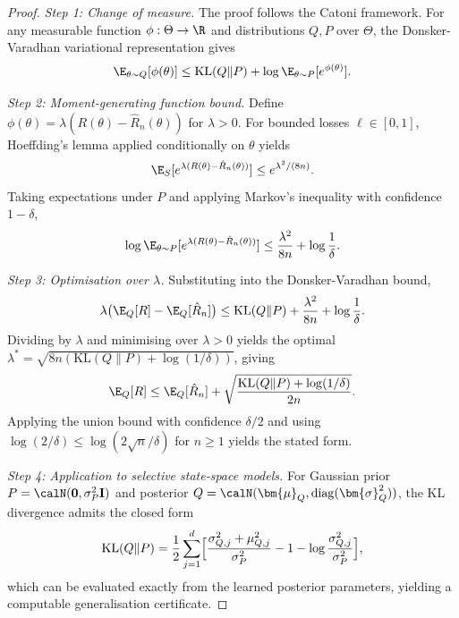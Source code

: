 \begin{proof}
\textit{Step 1: Change of measure.} The proof follows the Catoni framework. For any measurable function $\phi:\Theta\to\R$ and distributions $Q,P$ over $\Theta$, the Donsker-Varadhan variational representation gives
\begin{equation}
\E_{\theta\sim Q}[\phi(\theta)] \le \mathrm{KL}(Q\|P) + \log\E_{\theta\sim P}[e^{\phi(\theta)}].
\end{equation}

\textit{Step 2: Moment-generating function bound.} Define $\phi(\theta) = \lambda(R(\theta)-\hat{R}_n(\theta))$ for $\lambda>0$. For bounded losses $\ell\in[0,1]$, Hoeffding's lemma applied conditionally on $\theta$ yields
\begin{equation}
\E_S[e^{\lambda(R(\theta)-\hat{R}_n(\theta))}] \le e^{\lambda^2/(8n)}.
\end{equation}
Taking expectations under $P$ and applying Markov's inequality with confidence $1-\delta$,
\begin{equation}
\log\E_{\theta\sim P}[e^{\lambda(R(\theta)-\hat{R}_n(\theta))}] \le \frac{\lambda^2}{8n} + \log\frac{1}{\delta}.
\end{equation}

\textit{Step 3: Optimisation over $\lambda$.} Substituting into the Donsker-Varadhan bound,
\begin{equation}
\lambda\bigl(\E_Q[R]-\E_Q[\hat{R}_n]\bigr) \le \mathrm{KL}(Q\|P) + \frac{\lambda^2}{8n} + \log\frac{1}{\delta}.
\end{equation}
Dividing by $\lambda$ and minimising over $\lambda>0$ yields the optimal $\lambda^* = \sqrt{8n(\mathrm{KL}(Q\|P)+\log(1/\delta))}$, giving
\begin{equation}
\E_Q[R] \le \E_Q[\hat{R}_n] + \sqrt{\frac{\mathrm{KL}(Q\|P)+\log(1/\delta)}{2n}}.
\end{equation}
Applying the union bound with confidence $\delta/2$ and using $\log(2/\delta)\le\log(2\sqrt{n}/\delta)$ for $n\ge 1$ yields the stated form.

\textit{Step 4: Application to selective state-space models.} For Gaussian prior $P=\calN(\mathbf{0},\sigma_P^2\mathbf{I})$ and posterior $Q=\calN(\bm{\mu}_Q,\mathrm{diag}(\bm{\sigma}_Q^2))$, the KL divergence admits the closed form
\begin{equation}
\mathrm{KL}(Q\|P) = \frac{1}{2}\sum_{j=1}^d\Bigl[\frac{\sigma_{Q,j}^2+\mu_{Q,j}^2}{\sigma_P^2}-1-\log\frac{\sigma_{Q,j}^2}{\sigma_P^2}\Bigr],
\end{equation}
which can be evaluated exactly from the learned posterior parameters, yielding a computable generalisation certificate.
\end{proof}


